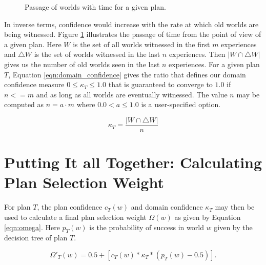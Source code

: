 \documentclass[a4paper]{article}
\begin{document}
\begin{figure}[ht]
\begin{center}
\end{center}
\caption{Passage of worlds with time for a given plan.}
\label{fig:domain_confidence}
\end{figure}

In inverse terms, confidence would increase with the rate at which old worlds are being witnessed. Figure \ref{fig:domain_confidence} illustrates the passage of time from the point of view of a given plan. Here $W$ is the set of all worlds witnessed in the first $m$ experiences and $\triangle W$ is the set of worlds witnessed in the last $n$ experiences. Then $|W \cap \triangle W|$ gives us the number of old worlds seen in the last $n$ experiences. For a given plan $T$, Equation \ref{eqn:domain_confidence} gives the ratio that defines our domain confidence measure $0 \leq \kappa_T \leq 1.0$ that is guaranteed to converge to $1.0$ if $n<=m$ and as long as all worlds are eventually witnessed. The value $n$ may be computed as $n=a \cdot m$ where $0.0 < a \leq 1.0$ is a user-specified option.


\begin{equation}
\kappa_T = \frac{| W \cap \triangle W |}{n}
\label{eqn:domain_confidence}
\end{equation}


\section{Putting It all Together: Calculating Plan Selection Weight}

For plan $T$, the plan confidence $c_T(w)$ and domain confidence $\kappa_T$ may then be used to calculate a final plan selection weight $\Omega(w)$ as given by Equation \ref{eqn:omega}. Here $p_T(w)$ is the probability of success in world $w$ given by the decision tree of plan $T$.


\begin{equation}
\Omega'_T(w) = 0.5 + \left[  c_T(w) *  \kappa_T * \left( p_T(w) - 0.5 \right)  \right].
\label{eqn:omega}
\end{equation}
\end{document}
